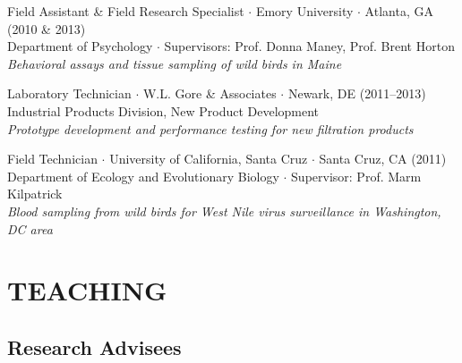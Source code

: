 \documentclass{cv}
\begin{document}
Field Assistant \& Field Research Specialist $\cdot$ Emory University $\cdot$ Atlanta, GA (2010 \& 2013) \\
Department of Psychology $\cdot$ Supervisors: Prof. Donna Maney, Prof. Brent Horton \\
\textit{Behavioral assays and tissue sampling of wild birds in Maine}

Laboratory Technician $\cdot$ W.L. Gore \& Associates $\cdot$ Newark, DE (2011--2013) \\
Industrial Products Division, New Product Development \\
\textit{Prototype development and performance testing for new filtration products}

Field Technician $\cdot$ University of California, Santa Cruz $\cdot$ Santa Cruz, CA (2011) \\
Department of Ecology and Evolutionary Biology $\cdot$ Supervisor: Prof. Marm Kilpatrick \\
\textit{Blood sampling from wild birds for West Nile virus surveillance in Washington, DC area}


\newpage
{}
\parttwo



\section*{TEACHING}


\subsection*{Research Advisees}

\end{document}
